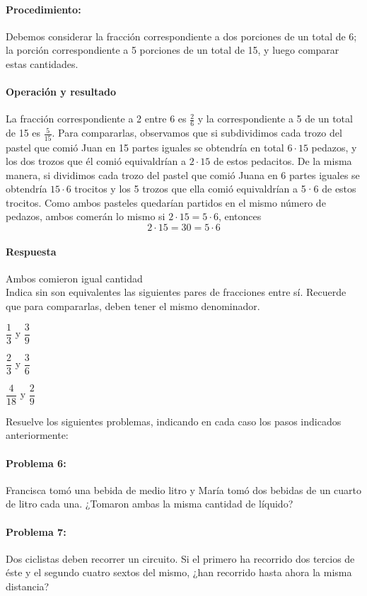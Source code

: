 \documentclass[10pt,twoside]{article}
\begin{document}
\paragraph*{Procedimiento:} Debemos considerar la fracción correspondiente a dos porciones de un total de 6; la porción correspondiente a 5 porciones de un total de 15, y luego comparar estas cantidades.
\paragraph*{Operación y resultado}
La fracción correspondiente a 2 entre 6 es $\frac{2}{6}$ y la correspondiente a 5 de un total de 15 es $\frac{5}{15}$. Para compararlas, observamos que si subdividimos cada trozo
del pastel que comió Juan en 15 partes iguales se obtendría en total $6\cdot 15$ pedazos, y los dos trozos que él comió
equivaldrían a $2\cdot 15$ de estos pedacitos. De la misma
manera, si dividimos cada trozo del pastel que comió Juana en 6 partes iguales se obtendría $15\cdot 6$ trocitos y los 5 trozos que ella comió equivaldrían a 5·6 de estos
trocitos. Como ambos pasteles quedarían partidos en el
mismo número de pedazos, ambos comerán lo mismo si $2\cdot 15 = 5\cdot 6$, entonces \[2\cdot 15=30= 5\cdot6\]
\paragraph*{Respuesta}
Ambos comieron igual cantidad\\
Indica sin son equivalentes las siguientes pares de fracciones entre sí. Recuerde que para compararlas, deben tener el mismo denominador.
\begin{itemize}
\begin{multicols}{3}
\item $\dfrac{1}{3}$ y $\dfrac{3}{9}$
\item $\dfrac{2}{3}$ y $\dfrac{3}{6}$
\item $\dfrac{4}{18}$ y $\dfrac{2}{9}$
\end{multicols}
\end{itemize}
Resuelve los siguientes problemas, indicando en cada caso los pasos indicados anteriormente:
\paragraph*{Problema 6:}
Francisca tomó una bebida de medio litro y María tomó dos bebidas de un cuarto de litro cada una. ¿Tomaron ambas la misma cantidad de líquido?
\paragraph*{Problema 7:}
Dos ciclistas deben recorrer un circuito. Si el primero ha recorrido dos tercios de éste y el segundo cuatro sextos del mismo, ¿han recorrido hasta ahora la misma distancia?
\end{document}
